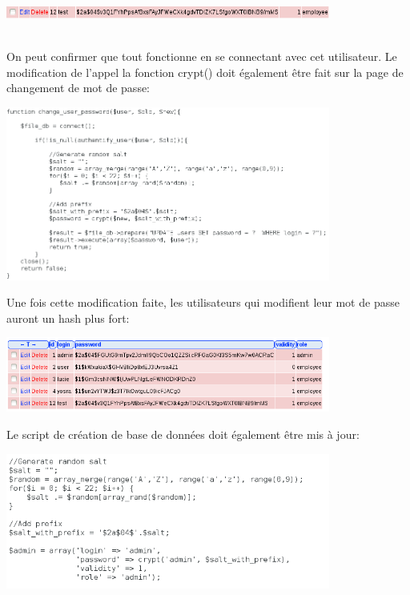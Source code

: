 \documentclass{article}
\begin{document}
\begin{center}\includegraphics[width=0.8\textwidth]{images/crypt_apres2.PNG}\end{center}\\

On peut confirmer que tout fonctionne en se connectant avec cet
utilisateur. Le modification de l'appel la fonction crypt() doit
également être fait sur la page de changement de mot de passe:

\begin{center}\includegraphics[width=0.8\textwidth]{images/crypt_apres3.PNG}\end{center}

Une fois cette modification faite, les utilisateurs qui modifient leur
mot de passe auront un hash plus fort:

\begin{center}\includegraphics[width=0.8\textwidth]{images/crypt_apres4.PNG}\end{center}

Le script de création de base de données doit également être mis à jour:

\begin{center}\includegraphics[width=0.8\textwidth]{images/crypt_apres5.PNG}\end{center}
\end{document}
